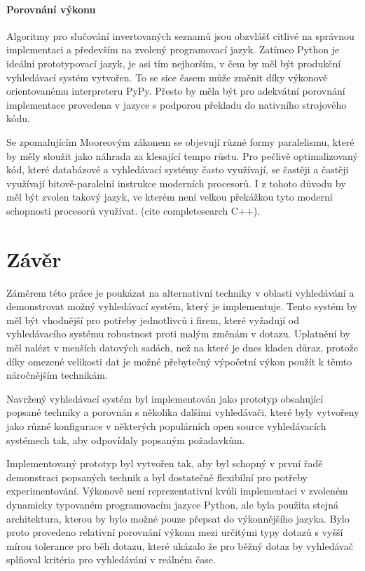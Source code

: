 \documentclass[11pt,letterpaper,oneside,openright]{book}
\begin{document}
\subsubsection{Porovnání výkonu}
Algoritmy pro slučování invertovaných seznamů jsou obzvlášť citlivé na správnou
implementaci a především na zvolený programovací jazyk. Zatímco Python je
ideální prototypovací jazyk, je asi tím nejhorším, v čem by měl být produkční
vyhledávací systém vytvořen. To se sice časem může změnit díky výkonově
orientovanému interpreteru PyPy. Přesto by měla být pro adekvátní porovnání
implementace provedena v jazyce s podporou překladu do nativního strojového
kódu.

Se zpomalujícím Mooreovým zákonem se objevují různé formy paralelismu, které by
měly sloužit jako náhrada za klesající tempo růstu. Pro pečlivě optimalizovaný
kód, které databázové a vyhledávací systémy často využívají, se častěji a
častěji využívají bitově-paralelní instrukce moderních procesorů. I z tohoto
důvodu by měl být zvolen takový jazyk, ve kterém není velkou překážkou tyto
moderní schopnosti procesorů využívat. (cite completesearch C++).


\chapter{Závěr}
Záměrem této práce je poukázat na alternativní techniky v oblasti vyhledávání a
demonstrovat možný vyhledávací systém, který je implementuje. Tento systém by
měl být vhodnější pro potřeby jednotlivců i firem, které vyžadují od
vyhledávacího systému robustnost proti malým změnám v dotazu. Uplatnění by měl
nalézt v menších datových sadách, než na které je dnes kladen důraz, protože
díky omezené velikosti dat je možné přebytečný výpočetní výkon použít k těmto
náročnějším technikám.

Navržený vyhledávací systém byl implementován jako prototyp obsahující popsané
techniky a porovnán s několika dalšími vyhledávači, které byly vytvořeny jako
různé konfigurace v některých populárních open source vyhledávacích systémech
tak, aby odpovídaly popsaným požadavkům.

Implementovaný prototyp byl vytvořen tak, aby byl schopný v první řadě
demonstraci popsaných technik a byl dostatečně flexibilní pro potřeby
experimentování. Výkonově není reprezentativní kvůli implementaci v zvoleném
dynamicky typovaném programovacím jazyce Python, ale byla použita stejná
architektura, kterou by bylo možné pouze přepsat do výkonnějšího jazyka. Bylo
proto provedeno relativní porovnání výkonu mezi určitými typy dotazů s vyšší
mírou tolerance pro běh dotazu, které ukázalo že pro běžný dotaz by vyhledávač
splňoval kritéria pro vyhledávání v reálném čase. 
\end{document}
